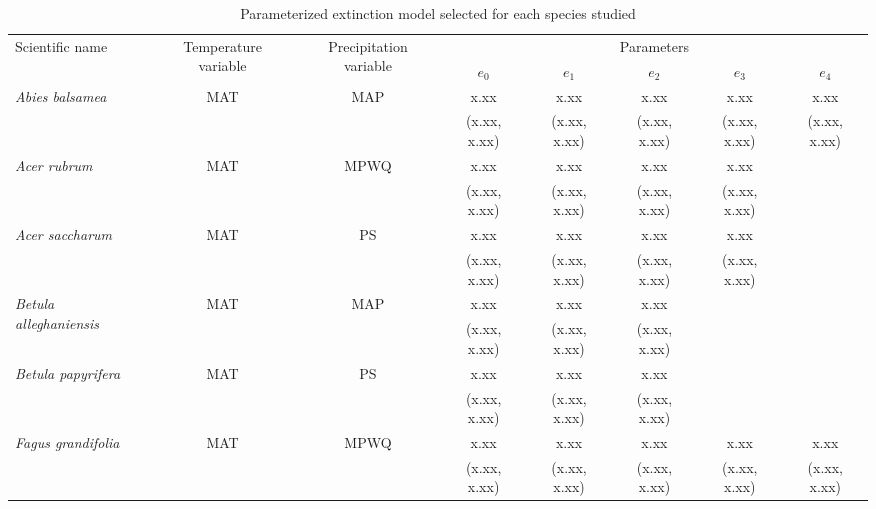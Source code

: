 \documentclass[11pt]{article}
\begin{document}

\newcommand{\ts}{\scriptsize}
\begin{table}[tb]
\small
\begin{threeparttable}
\label{tab:model_selection}
\caption{Parameterized extinction model selected for each species studied}
\begin{tabular}{lccccccc}
\toprule
\multirow{2}{*}{Scientific name} & \multirow{2}{2cm}{\centering Temperature variable\tnote{*}} & 
\multirow{2}{2cm}{\centering Precipitation variable\tnote{\textdagger}} & \multicolumn{5}{c}{Parameters\tnote{\textdaggerdbl}} \\
& & & $e_0$ & $e_1$ & $e_2$ & $e_3$ & $e_4$ \\ 
\midrule

\multirow{2}{*}{\it Abies balsamea} & \multirow{2}{*}{MAT} & \multirow{2}{*}{MAP} & x.xx\tnote{\textsection} & x.xx & x.xx & x.xx & x.xx \\
&  &  & {\ts (x.xx, x.xx)} & {\ts (x.xx, x.xx)} & {\ts (x.xx, x.xx)} & {\ts (x.xx, x.xx)} & {\ts (x.xx, x.xx)} \\

\multirow{2}{*}{\it Acer rubrum} & \multirow{2}{*}{MAT} & \multirow{2}{*}{MPWQ} & x.xx & x.xx & x.xx & x.xx & \\
&  &  & {\ts (x.xx, x.xx)} & {\ts (x.xx, x.xx)} & {\ts (x.xx, x.xx)} & {\ts (x.xx, x.xx)} &  \\

\multirow{2}{*}{\it Acer saccharum} & \multirow{2}{*}{MAT} & \multirow{2}{*}{PS} & x.xx & x.xx & x.xx & x.xx &  \\
&  &  & {\ts (x.xx, x.xx)} & {\ts (x.xx, x.xx)} & {\ts (x.xx, x.xx)} & {\ts (x.xx, x.xx)} &  \\

\multirow{2}{*}{\it Betula alleghaniensis} & \multirow{2}{*}{MAT} & \multirow{2}{*}{MAP} & x.xx & x.xx & x.xx & & \\
&  &  & {\ts (x.xx, x.xx)} & {\ts (x.xx, x.xx)} & {\ts (x.xx, x.xx)} &  & \\

\multirow{2}{*}{\it Betula papyrifera} & \multirow{2}{*}{MAT} & \multirow{2}{*}{PS} & x.xx & x.xx & x.xx &  &  \\
&  &  & {\ts (x.xx, x.xx)} & {\ts (x.xx, x.xx)} & {\ts (x.xx, x.xx)} &  &  \\

\multirow{2}{*}{\it Fagus grandifolia} & \multirow{2}{*}{MAT} & \multirow{2}{*}{MPWQ} & x.xx & x.xx & x.xx & x.xx & x.xx \\
&  &  & {\ts (x.xx, x.xx)} & {\ts (x.xx, x.xx)} & {\ts (x.xx, x.xx)} & {\ts (x.xx, x.xx)} & {\ts (x.xx, x.xx)} \\


\end{tabular}
\end{threeparttable}
\end{table}
\end{document}
